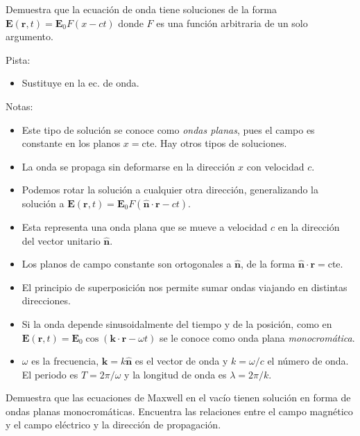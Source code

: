 \documentclass{exam}
\begin{document}
\begin{questions}
\question \label{21} Demuestra que la ecuación de onda tiene
  soluciones de la forma $\bm E(\bm r,t)=\bm E_0 F(x-ct)$ donde $F$ es
  una función arbitraria de un solo argumento.

  Pista:
  \begin{itemize}
  \item Sustituye en la ec. de onda.
  \end{itemize}
  Notas:
  \begin{itemize}
  \item Este tipo de solución se conoce como {\em ondas planas}, pues el
    campo es constante en los planos $x=$cte. Hay otros tipos de soluciones.
  \item La onda se propaga sin deformarse en la dirección $x$ con
    velocidad $c$.
  \item Podemos rotar la solución a cualquier otra dirección, generalizando la
    solución a $\bm E(\bm r,t)=\bm E_0 F(\hat {\bm n}\cdot\bm r-ct)$.
  \item Esta representa una onda plana que se mueve a velocidad $c$ en
    la dirección del vector unitario $\hat{\bm n}$.
  \item Los planos de campo constante son ortogonales a $\hat{\bm n}$,
    de la forma $\hat{\bm n}\cdot\bm r=$cte.
  \item El principio de superposición nos permite sumar ondas viajando
    en distintas direcciones.
  \item Si la onda depende sinusoidalmente del tiempo y de la
    posición, como en $\bm E(\bm r,t)=\bm E_0 \cos(\bm k\cdot\bm
    r-\omega t)$ se le conoce como onda plana {\em monocromática}.
  \item $\omega$ es la frecuencia, $\bm k=k\hat{\bm n}$ es el vector
    de onda y $k=\omega/c$ el número de onda. El periodo es
    $T=2\pi/\omega$ y la longitud de onda es $\lambda=2\pi/k$.
  \end{itemize}

\question \label{22} Demuestra que las ecuaciones de Maxwell en el
  vacío tienen solución en forma de ondas planas
  monocromáticas. Encuentra las relaciones entre el campo magnético y
  el campo eléctrico y la dirección de propagación.


\end{questions}
\end{document}
